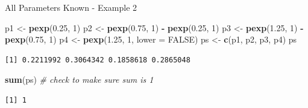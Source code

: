 \documentclass[
  ignorenonframetext,
]{beamer}
\newenvironment{Shaded}{\begin{snugshade}}{\end{snugshade}}
\newcommand{\AttributeTok}[1]{\textcolor[rgb]{0.13,0.29,0.53}{#1}}
\newcommand{\CommentTok}[1]{\textcolor[rgb]{0.56,0.35,0.01}{\textit{#1}}}
\newcommand{\ConstantTok}[1]{\textcolor[rgb]{0.56,0.35,0.01}{#1}}
\newcommand{\DecValTok}[1]{\textcolor[rgb]{0.00,0.00,0.81}{#1}}
\newcommand{\FloatTok}[1]{\textcolor[rgb]{0.00,0.00,0.81}{#1}}
\newcommand{\FunctionTok}[1]{\textcolor[rgb]{0.13,0.29,0.53}{\textbf{#1}}}
\newcommand{\NormalTok}[1]{#1}
\newcommand{\OtherTok}[1]{\textcolor[rgb]{0.56,0.35,0.01}{#1}}
\newcommand{\SpecialCharTok}[1]{\textcolor[rgb]{0.81,0.36,0.00}{\textbf{#1}}}
\begin{document}
\begin{frame}[fragile]{All Parameters Known - Example 2}
\label{all-parameters-known---example-2-3}
\begin{Shaded}
\begin{Highlighting}[]
\NormalTok{p1 }\OtherTok{\textless{}{-}} \FunctionTok{pexp}\NormalTok{(}\FloatTok{0.25}\NormalTok{, }\DecValTok{1}\NormalTok{)}
\NormalTok{p2 }\OtherTok{\textless{}{-}} \FunctionTok{pexp}\NormalTok{(}\FloatTok{0.75}\NormalTok{, }\DecValTok{1}\NormalTok{) }\SpecialCharTok{{-}} \FunctionTok{pexp}\NormalTok{(}\FloatTok{0.25}\NormalTok{, }\DecValTok{1}\NormalTok{)}
\NormalTok{p3 }\OtherTok{\textless{}{-}} \FunctionTok{pexp}\NormalTok{(}\FloatTok{1.25}\NormalTok{, }\DecValTok{1}\NormalTok{) }\SpecialCharTok{{-}} \FunctionTok{pexp}\NormalTok{(}\FloatTok{0.75}\NormalTok{, }\DecValTok{1}\NormalTok{)}
\NormalTok{p4 }\OtherTok{\textless{}{-}} \FunctionTok{pexp}\NormalTok{(}\FloatTok{1.25}\NormalTok{, }\DecValTok{1}\NormalTok{, }\AttributeTok{lower =} \ConstantTok{FALSE}\NormalTok{)}
\NormalTok{ps }\OtherTok{\textless{}{-}} \FunctionTok{c}\NormalTok{(p1, p2, p3, p4)}
\NormalTok{ps}
\end{Highlighting}
\end{Shaded}

\begin{verbatim}
[1] 0.2211992 0.3064342 0.1858618 0.2865048
\end{verbatim}

\begin{Shaded}
\begin{Highlighting}[]
\FunctionTok{sum}\NormalTok{(ps) }\CommentTok{\# check to make sure sum is 1}
\end{Highlighting}
\end{Shaded}

\begin{verbatim}
[1] 1
\end{verbatim}
\end{frame}
\end{document}
